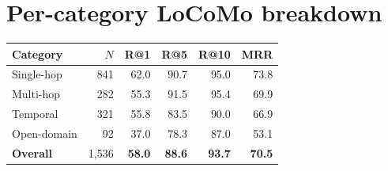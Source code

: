 \documentclass{article}
\begin{document}
\section{Per-category LoCoMo breakdown}

\begin{center}
\begin{tabular}{lrrrrr}
\toprule
Category        & $N$      & R@1          & R@5          & R@10         & MRR          \\
\midrule
Single-hop      & 841      & 62.0         & 90.7         & 95.0         & 73.8         \\
Multi-hop       & 282      & 55.3         & 91.5         & 95.4         & 69.9         \\
Temporal        & 321      & 55.8         & 83.5         & 90.0         & 66.9         \\
Open-domain     & 92       & 37.0         & 78.3         & 87.0         & 53.1         \\
\midrule
\textbf{Overall} & 1{,}536 & \textbf{58.0} & \textbf{88.6} & \textbf{93.7} & \textbf{70.5} \\
\bottomrule
\end{tabular}
\end{center}
\end{document}
